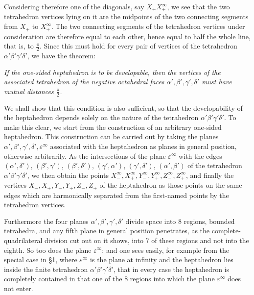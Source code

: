\documentclass[11pt,a4paper]{article}
\begin{document}
Considering therefore one of the diagonals, say $X_+X_+^\infty$, we see that the two tetrahedron vertices lying on it are the midpoints of the two connecting segments from $X_+$ to $X_+^\infty$. The two connecting segments of the tetrahedron vertices under consideration are therefore equal to each other, hence equal to half the whole line, that is, to $\frac{\pi}{2}$. Since this must hold for every pair of vertices of the tetrahedron $\alpha'\beta'\gamma'\delta'$, we have the theorem:

\emph{If the one-sided heptahedron is to be developable, then the vertices of the associated tetrahedron of the negative octahedral faces $\alpha',\beta',\gamma',\delta'$ must have mutual distances $\frac{\pi}{2}$.}

We shall show that this condition is also sufficient, so that the developability of the heptahedron depends solely on the nature of the tetrahedron $\alpha'\beta'\gamma'\delta'$. To make this clear, we start from the construction of an arbitrary one-sided heptahedron. This construction can be carried out by taking the planes $\alpha',\beta',\gamma',\delta',\varepsilon^\infty$ associated with the heptahedron as planes in general position, otherwise arbitrarily. As the intersections of the plane $\varepsilon^\infty$ with the edges $(\alpha',\delta')$, $(\beta',\gamma')$, $(\beta',\delta')$, $(\gamma',\alpha')$, $(\gamma',\delta')$, $(\alpha',\beta')$ of the tetrahedron $\alpha'\beta'\gamma'\delta'$, we then obtain the points $X_-^\infty,X_+^\infty,Y_-^\infty,Y_+^\infty,Z_-^\infty,Z_+^\infty$, and finally the vertices $X_-,X_+,Y_-,Y_+,Z_-,Z_+$ of the heptahedron as those points on the same edges which are harmonically separated from the first-named points by the tetrahedron vertices.

Furthermore the four planes $\alpha',\beta',\gamma',\delta'$ divide space into $8$ regions, bounded tetrahedra, and any fifth plane in general position penetrates, as the complete-quadrilateral division cut out on it shows, into $7$ of these regions and not into the eighth. So too does the plane $\varepsilon^\infty$; and one sees easily, for example from the special case in \S 1, where $\varepsilon^\infty$ is the plane at infinity and the heptahedron lies inside the finite tetrahedron $\alpha'\beta'\gamma'\delta'$, that in every case the heptahedron is completely contained in that one of the $8$ regions into which the plane $\varepsilon^\infty$ does not enter.
\end{document}
